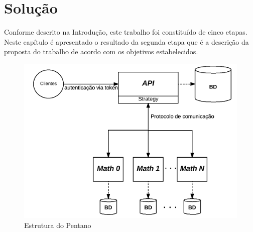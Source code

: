 \chapter{Solução} \label{cap:proposta}

Conforme descrito na Introdução, este trabalho foi constituído de cinco etapas.
Neste capítulo é apresentado o resultado da segunda etapa que é a descrição da proposta do trabalho de acordo com os objetivos estabelecidos.
% 
% 
\begin{figure}[h!]
\centering
\includegraphics[scale=0.7]{figuras/esquema_pentano_2.png}
\caption{Estrutura do Pentano}
\label{fig:pentano}
\end{figure}
% 
% 
